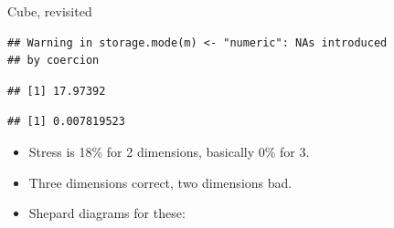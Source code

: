 \documentclass[ignorenonframetext,]{beamer}
\newenvironment{Shaded}{\begin{snugshade}}{\end{snugshade}}
\newcommand{\DataTypeTok}[1]{\textcolor[rgb]{0.13,0.29,0.53}{#1}}
\newcommand{\DecValTok}[1]{\textcolor[rgb]{0.00,0.00,0.81}{#1}}
\newcommand{\FloatTok}[1]{\textcolor[rgb]{0.00,0.00,0.81}{#1}}
\newcommand{\KeywordTok}[1]{\textcolor[rgb]{0.13,0.29,0.53}{\textbf{#1}}}
\newcommand{\NormalTok}[1]{#1}
\newcommand{\OperatorTok}[1]{\textcolor[rgb]{0.81,0.36,0.00}{\textbf{#1}}}
\newcommand{\StringTok}[1]{\textcolor[rgb]{0.31,0.60,0.02}{#1}}
\begin{document}
\begin{frame}[fragile]{Cube, revisited}
\protect\hypertarget{cube-revisited}{}

\begin{Shaded}
\end{Shaded}

\begin{verbatim}
## Warning in storage.mode(m) <- "numeric": NAs introduced
## by coercion
\end{verbatim}

\begin{Shaded}
\end{Shaded}

\begin{verbatim}
## [1] 17.97392
\end{verbatim}

\begin{Shaded}
\end{Shaded}

\begin{verbatim}
## [1] 0.007819523
\end{verbatim}

\begin{itemize}
\item
  Stress is 18\% for 2 dimensions, basically 0\% for 3.
\item
  Three dimensions correct, two dimensions bad.
\item
  Shepard diagrams for these:
\end{itemize}


\end{frame}
\end{document}
